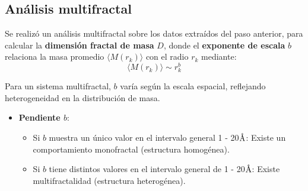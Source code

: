 	

	
	
	\subsection{An\'{a}lisis multifractal}
	
	Se realiz\'{o} un an\'{a}lisis multifractal sobre los datos extra\'{i}dos del paso anterior, para calcular la \textbf{dimensi\'{o}n fractal de masa} $D$, donde el \textbf{exponente de escala} $b$  relaciona la masa  promedio $\langle M(r_{k}) \rangle$ con el radio $r_{k}$ mediante:
	\begin{equation}
		\langle M(r_{k}) \rangle \sim r_{k}^b
	\end{equation}
	
	Para un sistema multifractal, $b$ var\'{i}a seg\'{u}n la escala espacial, reflejando heterogeneidad en la distribuci\'{o}n de masa.
	\begin{itemize}
		\item \textbf{Pendiente $b$}:
		\begin{itemize}
			\item Si $b$ muestra un \'{u}nico valor en el intervalo general 1 - 20$\textup{\r{A}}$: Existe un comportamiento monofractal (estructura homog\'{e}nea).
			\item Si $b$  tiene distintos valores en el intervalo general de 1 - 20$\textup{\r{A}}$: Existe multifractalidad (estructura heterog\'{e}nea).
		\end{itemize}
	\end{itemize}
	
